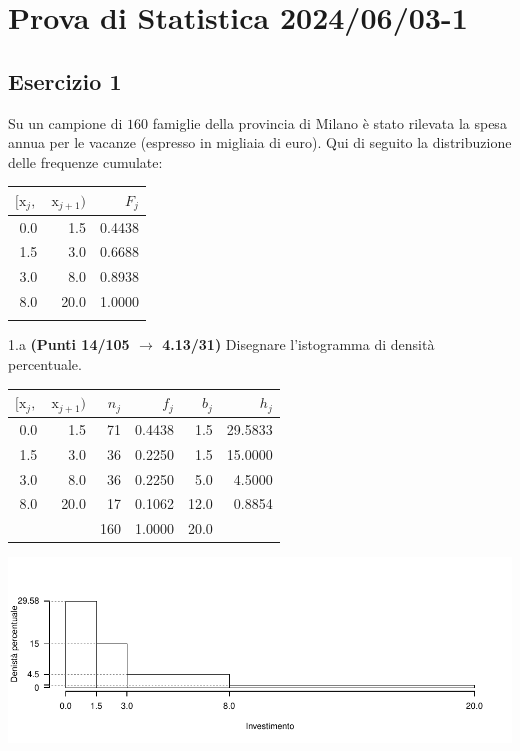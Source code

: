 \documentclass[
  11pt,
]{book}
\theoremstyle{mytheoremstyle}
\theoremstyle{mydefstyle}
\newenvironment{sol}
  {
  \begin{tcolorbox}[enhanced,breakable,arc=0.1mm,boxrule=1pt,colback=white,colframe=iblue,
  title=\bf \fontfamily{lmss}\selectfont \hspace{.5 cm} Soluzione,drop fuzzy shadow]

}{
\end{tcolorbox}
  }
\begin{document}
\section{Prova di Statistica 2024/06/03-1}\label{prova-di-statistica-20240603-1}

\subsection{Esercizio 1}\label{esercizio-1-34}

Su un campione di \(160\) famiglie della provincia di Milano è stato rilevata la spesa annua per le vacanze (espresso in migliaia di euro). Qui di seguito la distribuzione delle frequenze cumulate:

\begin{table}[H]
\centering
\begin{tabular}{rrr}
\toprule
$[\text{x}_j,$ & $\text{x}_{j+1})$ & $F_j$\\
\midrule
0.0 & 1.5 & 0.4438\\
1.5 & 3.0 & 0.6688\\
3.0 & 8.0 & 0.8938\\
8.0 & 20.0 & 1.0000\\
 &  & \\
\bottomrule
\end{tabular}
\end{table}

1.a \textbf{(Punti 14/105 \(\rightarrow\) 4.13/31)} Disegnare l'istogramma di densità percentuale.

\begin{sol}

\begin{table}[H]
\centering
\begin{tabular}{rrrrrr}
\toprule
$[\text{x}_j,$ & $\text{x}_{j+1})$ & $n_j$ & $f_j$ & $b_j$ & $h_j$\\
\midrule
0.0 & 1.5 & 71 & 0.4438 & 1.5 & 29.5833\\
1.5 & 3.0 & 36 & 0.2250 & 1.5 & 15.0000\\
3.0 & 8.0 & 36 & 0.2250 & 5.0 & 4.5000\\
8.0 & 20.0 & 17 & 0.1062 & 12.0 & 0.8854\\
 &  & 160 & 1.0000 & 20.0 & \\
\bottomrule
\end{tabular}
\end{table}

\begin{center}\includegraphics{Esami_passati_con_soluzioni_files/figure-latex/2024-43-1} \end{center}

\end{sol}
\end{document}
